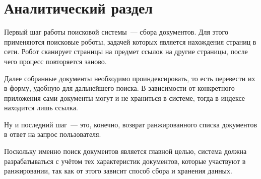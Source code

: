 \chapter{Аналитический раздел}
Первый шаг работы поисковой системы~--- сбора документов. Для этого применяются поисковые роботы, задачей которых является нахождения страниц в сети. Робот сканирует страницы на предмет ссылок на другие страницы, после чего процесс повторяется заново.

Далее собранные документы необходимо проиндексировать, то есть перевести их в форму, удобную для дальнейшего поиска. В зависимости от конкретного приложения сами документы могут и не храниться в системе, тогда в индексе находится лишь ссылка.

Ну и последний шаг~--- это, конечно, возврат ранжированного списка документов в ответ на запрос пользователя.

Поскольку именно поиск документов является главной целью, система должна разрабатываться с учётом тех характеристик документов, которые участвуют в ранжировании, так как от этого зависит способ сбора и хранения данных.


% 
% 
